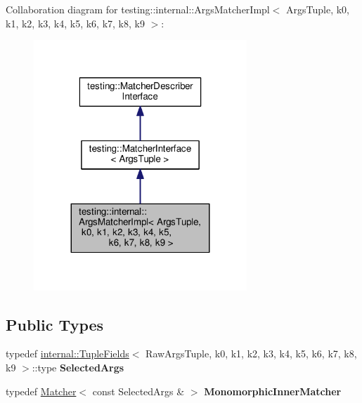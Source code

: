 Collaboration diagram for testing\+:\+:internal\+:\+:Args\+Matcher\+Impl$<$ Args\+Tuple, k0, k1, k2, k3, k4, k5, k6, k7, k8, k9 $>$\+:
\nopagebreak
\begin{figure}[H]
\begin{center}
\leavevmode
\includegraphics[width=227pt]{classtesting_1_1internal_1_1_args_matcher_impl__coll__graph}
\end{center}
\end{figure}
\subsection*{Public Types}
\begin{DoxyCompactItemize}
\item 
\mbox{\label{classtesting_1_1internal_1_1_args_matcher_impl_ab061679f6251e56ccbedaf0c316d00ff}} 
typedef \mbox{\hyperlink{classtesting_1_1internal_1_1_tuple_fields}{internal\+::\+Tuple\+Fields}}$<$ Raw\+Args\+Tuple, k0, k1, k2, k3, k4, k5, k6, k7, k8, k9 $>$\+::type {\bfseries Selected\+Args}
\item 
\mbox{\label{classtesting_1_1internal_1_1_args_matcher_impl_ab90d2c074b2072d6c39bf26209fb941f}} 
typedef \mbox{\hyperlink{classtesting_1_1_matcher}{Matcher}}$<$ const Selected\+Args \& $>$ {\bfseries Monomorphic\+Inner\+Matcher}
\end{DoxyCompactItemize}
